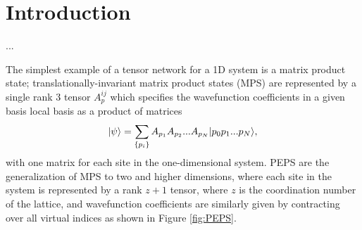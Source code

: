 
\section{Introduction}

...\cite{parameswaran2013, parameswaran2013-2}

The simplest example of a tensor network for a 1D system is a matrix product state; translationally-invariant matrix product states (MPS) are represented by a single rank 3 tensor $A_p^{ij}$ which specifies the wavefunction coefficients in a given basis local basis as a product of matrices $$\vert \psi \rangle = \sum\limits_{\{p_i\}} A_{p_1} A_{p_2} ... A_{p_N} \vert p_0 p_1 ... p_N \rangle,$$
with one matrix for each site in the one-dimensional system.
PEPS are the generalization of MPS to two and higher dimensions, where each site in the system is represented by a rank $z+1$ tensor, where $z$ is the coordination number of the lattice, and wavefunction coefficients are similarly given by contracting over all virtual indices as shown in Figure \ref{fig:PEPS}.\cite{verstraete2004}